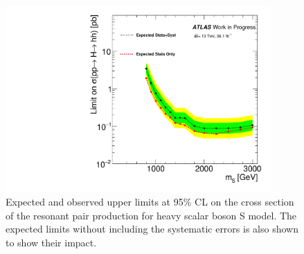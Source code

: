 \begin{figure}[h]
\begin{center}
\includegraphics[width=0.9\textwidth]{figures/Final_limits}
\caption[Expected and observed upper limits at 95\% CL on the cross section of the resonant pair production for heavy scalar boson S model]{Expected and observed upper limits at 95\% CL on the cross section of the resonant pair production for heavy scalar boson S model. The expected limits without including the systematic errors is also shown to show their impact.}
\label{fig:boosted_only_limits_new}
\end{center}
\end{figure}
\newpage

